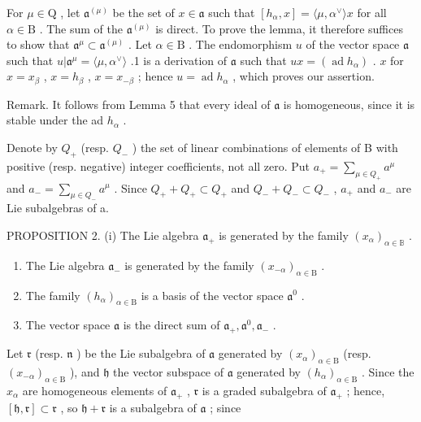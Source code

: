 For \(\mu \in \mathrm{Q}\) , let \(\mathfrak{a}^{(\mu)}\) be the set of \(x \in \mathfrak{a}\) such that \([h_{\alpha}, x] = \langle \mu, \alpha^{\vee} \rangle x\) for all \(\alpha \in \mathrm{B}\) . The sum of the \(\mathfrak{a}^{(\mu)}\) is direct. To prove the lemma, it therefore suffices to show that \(\mathfrak{a}^{\mu} \subset \mathfrak{a}^{(\mu)}\) . Let \(\alpha \in \mathrm{B}\) . The endomorphism \(u\) of the vector space \(\mathfrak{a}\) such that \(u|\mathfrak{a}^{\mu} = \langle \mu, \alpha^{\vee} \rangle\) .1 is a derivation of \(\mathfrak{a}\) such that \(ux = (\operatorname{ad} h_{\alpha})\) . \(x\) for \(x = x_{\beta}\) , \(x = h_{\beta}\) , \(x = x_{-\beta}\) ; hence \(u = \operatorname{ad} h_{\alpha}\) , which proves our assertion.

Remark. It follows from Lemma 5 that every ideal of \(\mathfrak{a}\) is homogeneous, since it is stable under the ad \(h_{\alpha}\) .

Denote by \(Q_{+}\) (resp. \(Q_{-}\) ) the set of linear combinations of elements of B with positive (resp. negative) integer coefficients, not all zero. Put \(a_{+} = \sum_{\mu \in Q_{+}} a^{\mu}\) and \(a_{-} = \sum_{\mu \in Q_{-}} a^{\mu}\) . Since \(Q_{+} + Q_{+} \subset Q_{+}\) and \(Q_{-} + Q_{-} \subset Q_{-}\) , \(a_{+}\) and \(a_{-}\) are Lie subalgebras of a.

PROPOSITION 2. (i) The Lie algebra \(\mathfrak{a}_{+}\) is generated by the family \((x_{\alpha})_{\alpha \in \mathbb{B}}\) .

\begin{enumerate}
\def\labelenumi{(\roman{enumi})}
\setcounter{enumi}{1}
\item
  The Lie algebra \(\mathfrak{a}_{-}\) is generated by the family \((x_{-\alpha})_{\alpha \in \mathrm{B}}\) .
\item
  The family \((h_{\alpha})_{\alpha \in \mathrm{B}}\) is a basis of the vector space \(\mathfrak{a}^0\) .
\item
  The vector space \(\mathfrak{a}\) is the direct sum of \(\mathfrak{a}_{+},\mathfrak{a}^{0},\mathfrak{a}_{-}\) .
\end{enumerate}

Let \(\mathfrak{r}\) (resp. \(\mathfrak{n}\) ) be the Lie subalgebra of \(\mathfrak{a}\) generated by \((x_{\alpha})_{\alpha \in \mathrm{B}}\) (resp. \((x_{-\alpha})_{\alpha \in \mathrm{B}}\) ), and \(\mathfrak{h}\) the vector subspace of \(\mathfrak{a}\) generated by \((h_{\alpha})_{\alpha \in \mathrm{B}}\) . Since the \(x_{\alpha}\) are homogeneous elements of \(\mathfrak{a}_{+}\) , \(\mathfrak{r}\) is a graded subalgebra of \(\mathfrak{a}_{+}\) ; hence, \([\mathfrak{h},\mathfrak{r}]\subset \mathfrak{r}\) , so \(\mathfrak{h} + \mathfrak{r}\) is a subalgebra of \(\mathfrak{a}\) ; since

